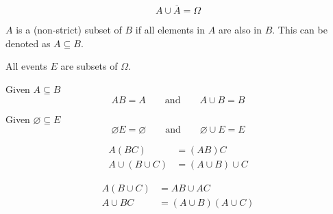 \documentclass{article}
\begin{document}
\begin{theorem}
    \begin{equation*}
        A \cup \overline{A} = \Omega
    \end{equation*}
\end{theorem}
\begin{definition}[Subset]
    \(A\) is a (non-strict) subset of \(B\) if all elements in \(A\) are also in \(B\).
    This can be denoted as \(A \subseteq B\).
\end{definition}
\begin{theorem}
    All events \(E\) are subsets of \(\Omega\).
\end{theorem}
\begin{theorem}
    Given \(A \subseteq B\)
    \begin{equation*}
        AB = A \quad\quad \text{and} \quad\quad A \cup B = B
    \end{equation*}
\end{theorem}
\begin{corollary}
    Given \(\varnothing \subseteq E\)
    \begin{equation*}
        \varnothing E = \varnothing \quad\quad \text{and} \quad\quad \varnothing \cup E = E
    \end{equation*}
\end{corollary}
\begin{theorem}
    \begin{align*}
        A \left( BC \right) & = \left( AB \right) C \\
        A \cup \left( B \cup C \right) & = \left( A \cup B \right) \cup C
    \end{align*}
\end{theorem}
\begin{theorem}
    \begin{align*}
        A \left(B \cup C\right) & = AB \cup AC \\
        A \cup BC & = \left( A \cup B \right) \left( A \cup C \right)
    \end{align*}
\end{theorem}
\end{document}
